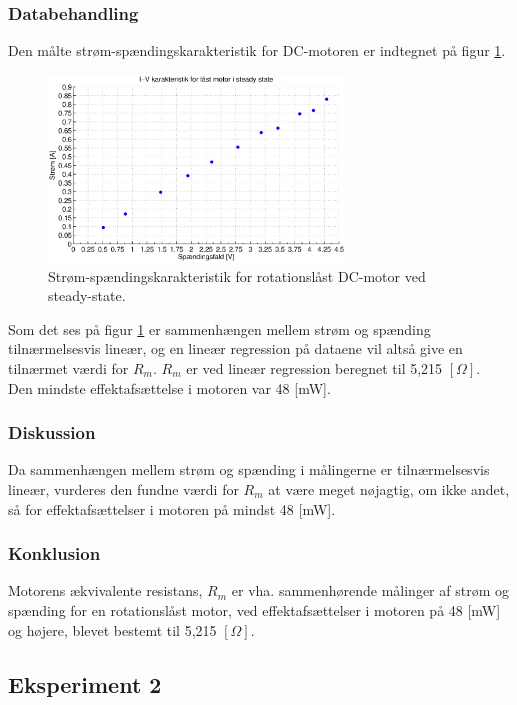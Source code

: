 \subsubsection{Databehandling}
Den målte strøm-spændingskarakteristik for DC-motoren er indtegnet på figur \ref{fig:resistans0}.
\begin{figure}[th!]
	\centering
	\includegraphics[width=0.7\textwidth]{./graphics/resistans1.eps}
	\caption[Strøm-spændingskarakteristik for rotationslåst DC-motor]{Strøm-spændingskarakteristik for rotationslåst DC-motor ved steady-state.}
	\label{fig:resistans0}
\end{figure}
Som det ses på figur \ref{fig:resistans0} er sammenhængen mellem strøm og spænding
tilnærmelsesvis lineær, og en lineær regression på dataene vil altså give en tilnærmet værdi for \(R_m\).
\(R_m\) er ved lineær regression beregnet til 5,215 \([\Omega]\).\\
Den mindste effektafsættelse i motoren var 48 [mW].

\subsubsection{Diskussion}
Da sammenhængen mellem strøm og spænding i målingerne er tilnærmelsesvis lineær,
vurderes den fundne værdi for \(R_m\) at være meget nøjagtig,
om ikke andet, så for effektafsættelser i motoren på mindst 48 [mW].

\subsubsection{Konklusion}
Motorens ækvivalente resistans, \(R_m\) er vha. sammenhørende målinger af strøm og spænding
for en rotationslåst motor, ved effektafsættelser i motoren på 48 [mW] og højere,
blevet bestemt til 5,215 \([\Omega]\).

\subsection{Eksperiment 2}
\label{ss:eksperiment2}
